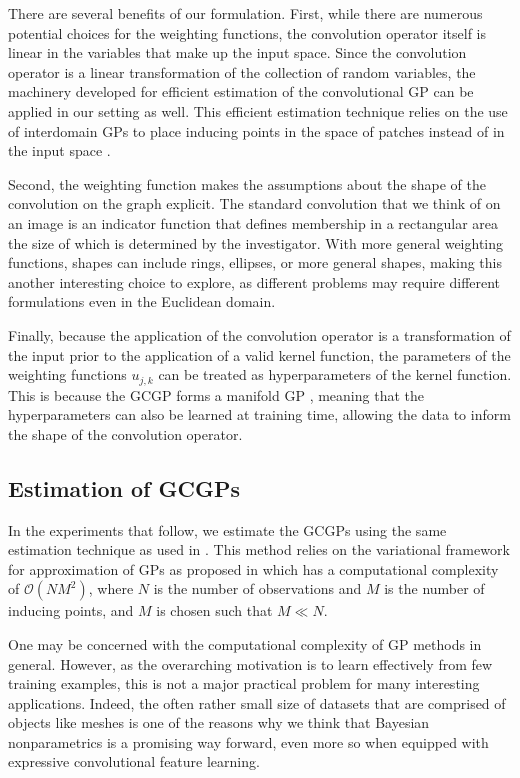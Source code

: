 \documentclass{article}
\begin{document}
There are several benefits of our formulation. First, while there are numerous potential choices for the weighting functions, the convolution operator itself is linear in the variables that make up the input space. Since the convolution operator is a linear transformation of the collection of random variables, the machinery developed for efficient estimation of the convolutional GP can be applied in our setting as well. This efficient estimation technique relies on the use of interdomain GPs to place inducing points in the space of patches instead of in the input space \citep{interdomainGP}.

Second, the weighting function makes the assumptions about the shape of the convolution on the graph explicit. The standard convolution that we think of on an image is an indicator function that defines membership in a rectangular area the size of which is determined by the investigator. With more general weighting functions, shapes can include rings, ellipses, or more general shapes, making this another interesting choice to explore, as different problems may require different formulations even in the Euclidean domain.

Finally, because the application of the convolution operator is a transformation of the input prior to the application of a valid kernel function, the parameters of the weighting functions $u_{j,k}$ can be treated as hyperparameters of the kernel function. This is because the GCGP forms a manifold GP \citep{manifoldGP}, meaning that the hyperparameters can also be learned at training time, allowing the data to inform the shape of the convolution operator.

\subsection{Estimation of GCGPs}
In the experiments that follow, we estimate the GCGPs using the same estimation technique as used in \citet{convgp}. This method relies on the variational framework for approximation of GPs as proposed in \citet{pmlr-v38-hensman15} which has a computational complexity of $\mathcal{O}(NM^2)$, where $N$ is the number of observations and $M$ is the number of inducing points, and $M$ is chosen such that $M\ll N$.

One may be concerned with the computational complexity of GP methods in general. However, as the overarching motivation is to learn effectively from few training examples, this is not a major practical problem for many interesting applications. Indeed, the often rather small size of datasets that are comprised of objects like meshes is one of the reasons why we think that Bayesian nonparametrics is a promising way forward, even more so when equipped with expressive convolutional feature learning. 
\end{document}
